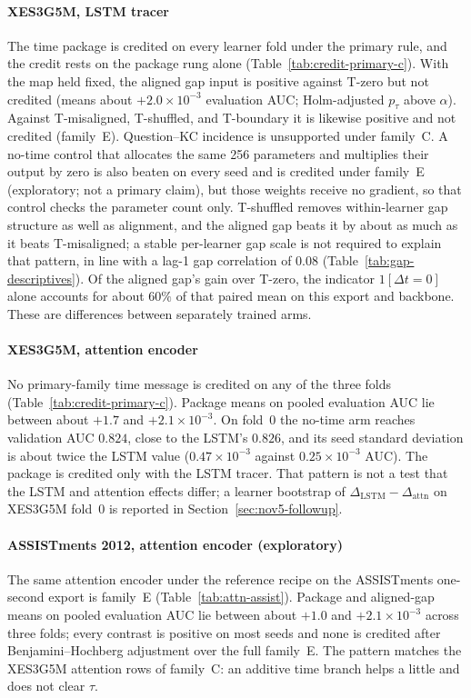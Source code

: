 \documentclass[review,12pt]{elsarticle}
\begin{document}
\paragraph{XES3G5M, LSTM tracer}
The time package is credited on every learner fold under the primary
rule, and the credit rests on the package rung alone
(Table~\ref{tab:credit-primary-c}). With the map held fixed, the
aligned gap input is positive against T-zero but not credited
(means about $+2.0\times 10^{-3}$ evaluation AUC; Holm-adjusted
$p_\tau$ above $\alpha$). Against T-misaligned, T-shuffled, and
T-boundary it is likewise positive and not credited (family~E).
Question--KC incidence is unsupported under family~C. A no-time control
that allocates the same 256 parameters and multiplies their output by
zero is also beaten on every seed and is credited under family~E
(exploratory; not a primary claim), but those weights receive no
gradient, so that control checks the parameter count only. T-shuffled
removes within-learner gap structure as well as alignment, and the
aligned gap beats it by about as much as it beats T-misaligned; a
stable per-learner gap scale is not required to explain that pattern,
in line with a lag-1 gap correlation of $0.08$
(Table~\ref{tab:gap-descriptives}). Of the aligned gap's gain over
T-zero, the indicator $1[\Delta t{=}0]$ alone accounts for about
$60\%$ of that paired mean on this export and backbone.
These are differences between separately trained arms.

\paragraph{XES3G5M, attention encoder}
No primary-family time message is credited on any of the three folds
(Table~\ref{tab:credit-primary-c}). Package means on pooled evaluation
AUC lie between about $+1.7$ and $+2.1\times 10^{-3}$. On fold~0 the
no-time arm reaches validation AUC $0.824$, close to the LSTM's
$0.826$, and its seed standard deviation is about twice the LSTM value
($0.47\times 10^{-3}$ against $0.25\times 10^{-3}$ AUC). The package
is credited only with the LSTM tracer. That pattern is not a test that
the LSTM and attention effects differ; a learner bootstrap of
$\Delta_{\mathrm{LSTM}}-\Delta_{\mathrm{attn}}$ on XES3G5M fold~0 is
reported in Section~\ref{sec:nov5-followup}.

\paragraph{ASSISTments 2012, attention encoder (exploratory)}
The same attention encoder under the reference recipe on the
ASSISTments one-second export is family~E
(Table~\ref{tab:attn-assist}). Package and aligned-gap means on pooled
evaluation AUC lie between about $+1.0$ and $+2.1\times 10^{-3}$ across
three folds; every contrast is positive on most seeds and none is
credited after Benjamini--Hochberg adjustment over the full family~E.
The pattern matches the XES3G5M attention rows of family~C: an additive
time branch helps a little and does not clear $\tau$.
\end{document}
